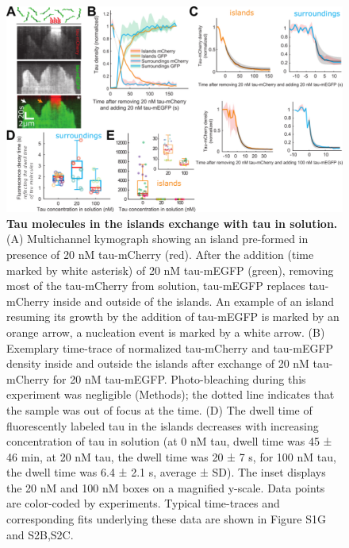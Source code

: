 \begin{figure}[h!]
	\centering
	\includegraphics[width=1\linewidth]{Figures/tau_EXCHANGE.png}
	\caption[Tau molecules in the islands exchange with tau in solution.]{
	\textbf{Tau molecules in the islands exchange with tau in solution.} (A) Multichannel kymograph showing an island pre-formed in presence of 20 nM tau-mCherry (red). After the addition (time marked by white asterisk) of 20 nM tau-mEGFP (green), removing most of the tau-mCherry from solution, tau-mEGFP replaces tau-mCherry inside and outside of the islands. An example of an island resuming its growth by the addition of tau-mEGFP is marked by an orange arrow, a nucleation event is marked by a white arrow. (B) Exemplary time-trace of normalized tau-mCherry and tau-mEGFP density inside and outside the islands after exchange of 20 nM tau-mCherry for 20 nM tau-mEGFP. Photo-bleaching during this experiment was negligible (Methods); the dotted line indicates that the sample was out of focus at the time. (D) The dwell time of fluorescently labeled tau in the islands decreases with increasing concentration of tau in solution (at 0 nM tau, dwell time was 45 ± 46 min, at 20 nM tau, the dwell time was 20 ± 7 s, for 100 nM tau, the dwell time was 6.4 ± 2.1 s, average ± SD). The inset displays the 20 nM and 100 nM boxes on a magnified y-scale. Data points are color-coded by experiments. Typical time-traces and corresponding fits underlying these data are shown in Figure S1G and S2B,S2C.
		}\label{tauexchange}
\end{figure}

